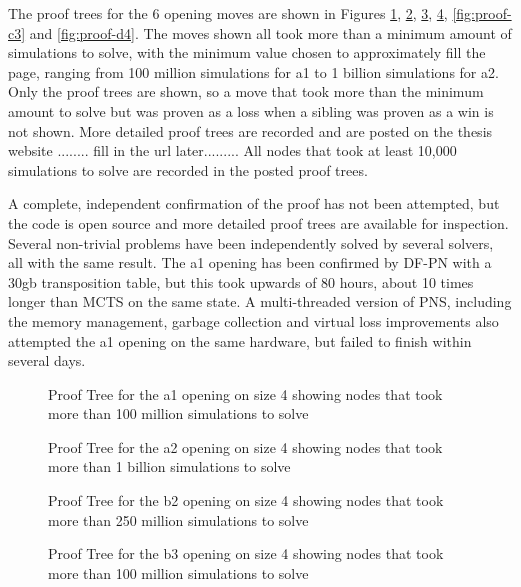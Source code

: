 The proof trees for the 6 opening moves are shown in Figures \ref{fig:proof-a1}, \ref{fig:proof-a2}, \ref{fig:proof-b2}, \ref{fig:proof-b3}, \ref{fig:proof-c3} and \ref{fig:proof-d4}. The moves shown all took more than a minimum amount of simulations to solve, with the minimum value chosen to approximately fill the page, ranging from 100 million simulations for a1 to 1 billion simulations for a2. Only the proof trees are shown, so a move that took more than the minimum amount to solve but was proven as a loss when a sibling was proven as a win is not shown. More detailed proof trees are recorded and are posted on the thesis website ........ fill in the url later......... All nodes that took at least 10,000 simulations to solve are recorded in the posted proof trees.

A complete, independent confirmation of the proof has not been attempted, but the code is open source and more detailed proof trees are available for inspection. Several non-trivial problems have been independently solved by several solvers, all with the same result. The a1 opening has been confirmed by DF-PN with a 30gb transposition table, but this took upwards of 80 hours, about 10 times longer than MCTS on the same state. A multi-threaded version of PNS, including the memory management, garbage collection and virtual loss improvements also attempted the a1 opening on the same hardware, but failed to finish within several days.

\begin{figure}
\centering

\caption{Proof Tree for the a1 opening on size 4 showing nodes that took more than 100 million simulations to solve}
\label{fig:proof-a1}
\end{figure}

\begin{figure}
\centering

\caption{Proof Tree for the a2 opening on size 4 showing nodes that took more than 1 billion simulations to solve}
\label{fig:proof-a2}
\end{figure}

\begin{figure}
\centering

\caption{Proof Tree for the b2 opening on size 4 showing nodes that took more than 250 million simulations to solve}
\label{fig:proof-b2}
\end{figure}

\begin{figure}
\centering

\caption{Proof Tree for the b3 opening on size 4 showing nodes that took more than 100 million simulations to solve}
\label{fig:proof-b3}
\end{figure}


